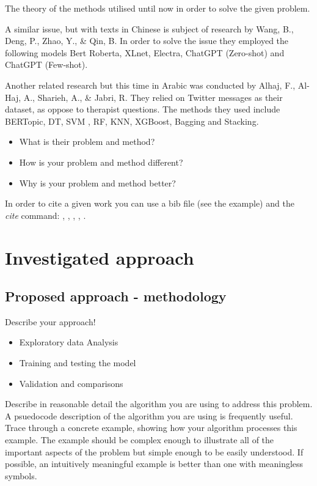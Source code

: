 \documentclass[runningheads,a4paper,11pt]{report}
\begin{document}
The theory of the methods utilised until now in order to solve the given problem.

A similar issue, but with texts in Chinese is subject of research by Wang, B., Deng, P., Zhao, Y., \& Qin, B. In order to solve the issue they employed the following models Bert  
Roberta, XLnet, Electra, ChatGPT (Zero-shot) and ChatGPT (Few-shot).

Another related research but this time in Arabic was conducted by Alhaj, F., Al-Haj, A., Sharieh, A., \& Jabri, R. They relied on Twitter messages as their dataset, as oppose to therapist questions. The methods they used include BERTopic, DT, SVM , RF, KNN, XGBoost, Bagging and Stacking.

\begin{itemize}
	\item What is their problem and method? 
	\item How is your problem and method different? 
	\item Why is your problem and method better?
\end{itemize}

In order to cite a given work you can use a bib file (see the example) and the $\ $ \textit{cite} command:
\cite{kennedy1}, \cite{Koh06}, \cite{Berlekamp82}, \cite{Storn95}, \cite{firefox}.



\chapter{Investigated approach}
\label{chapter:proposedApproach}

\section{Proposed approach - methodology}
\label{section:ProposedApproach}

Describe your approach!

\begin{itemize}
	\item Exploratory data Analysis
	\item Training and testing the model
	\item Validation and comparisons
\end{itemize}

Describe in reasonable detail the algorithm you are using to address this problem. A psuedocode description of the algorithm you are using is frequently useful. Trace through a concrete example, showing how your algorithm processes this example. The example should be complex enough to illustrate all of the important aspects of the problem but simple enough to be easily understood. If possible, an intuitively meaningful example is better than one with meaningless symbols.
\end{document}
